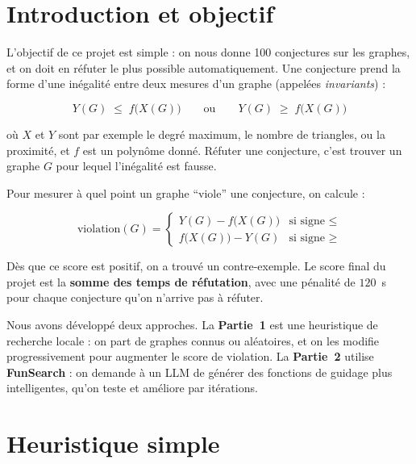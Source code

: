 \documentclass[12pt,a4paper]{article}
\begin{document}
\tableofcontents
\newpage

\section{Introduction et objectif}

L'objectif de ce projet est simple : on nous donne 100 conjectures sur les graphes,
et on doit en réfuter le plus possible automatiquement.  Une conjecture prend la forme
d'une inégalité entre deux mesures d'un graphe (appelées \emph{invariants}) :

\[
  Y(G) \;\leq\; f\!\bigl(X(G)\bigr)
  \qquad \text{ou} \qquad
  Y(G) \;\geq\; f\!\bigl(X(G)\bigr)
\]

où $X$ et $Y$ sont par exemple le degré maximum, le nombre de triangles, ou la
proximité, et $f$ est un polynôme donné.  Réfuter une conjecture, c'est trouver
un graphe $G$ pour lequel l'inégalité est fausse.

Pour mesurer à quel point un graphe ``viole'' une conjecture, on calcule :

\[
  \mathrm{violation}(G) =
  \begin{cases}
    Y(G) - f\!\bigl(X(G)\bigr) & \text{si signe } \leq \\
    f\!\bigl(X(G)\bigr) - Y(G) & \text{si signe } \geq
  \end{cases}
\]

Dès que ce score est positif, on a trouvé un contre-exemple.  Le score final du
projet est la \textbf{somme des temps de réfutation}, avec une pénalité de $120$~s
pour chaque conjecture qu'on n'arrive pas à réfuter.

Nous avons développé deux approches.  La \textbf{Partie~1} est une heuristique
de recherche locale : on part de graphes connus ou aléatoires, et on les modifie
progressivement pour augmenter le score de violation.  La \textbf{Partie~2}
utilise \textbf{FunSearch} : on demande à un LLM de générer des fonctions de
guidage plus intelligentes, qu'on teste et améliore par itérations.

\section{Heuristique simple}
\end{document}
